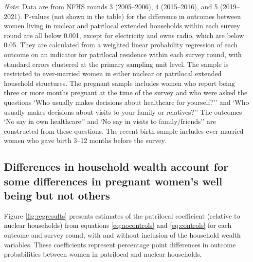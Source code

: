 \documentclass[10pt,twoside,reqno]{article}
\begin{document}
\begin{table}[H]
\caption{: Pregnant women in patrilocal extended households are advantaged in wealth and maternal healthcare use, but disadvantaged in autonomy outcomes}
\label{tab:sumstats}
\vspace{-4pt}

\begin{scriptsize}
\setlength{\tabcolsep}{7pt}
\renewcommand{\arraystretch}{1.15}

\makebox[\linewidth][c]{%
%
}

\end{scriptsize}

\vspace{1ex}
\small\scriptsize{\textsf{\textit{Note}: Data are from NFHS rounds 3 (2005--2006), 4 (2015--2016), and 5 (2019--2021).}}
\small\scriptsize{\textsf{P-values (not shown in the table) for the difference in outcomes between women living in nuclear and patrilocal extended households within each survey round are all below 0.001, except for electricity and owns radio, which are below 0.05. They are calculated from a weighted linear probability regression of each outcome on an indicator for patrilocal residence within each survey round, with standard errors clustered at the primary sampling unit level.}}
\newline
\small\scriptsize{\textsf{The sample is restricted to ever-married women in either nuclear or patrilocal extended household structures. The pregnant sample includes women who report being three or more months pregnant at the time of the survey and who were asked the questions `Who usually makes decisions about healthcare for yourself?'' and `Who usually makes decisions about visits to your family or relatives?''}}
\small\scriptsize{\textsf{The outcomes `No say in own healthcare'' and `No say in visits to family/friends'' are constructed from these questions. The recent birth sample includes ever-married women who gave birth 3--12 months before the survey.}}

\end{table}

\subsection*{Differences in household wealth account for some differences in pregnant women's well being but not others}

Figure \ref{fig:regresults} presents estimates of the patrilocal coefficient (relative to nuclear households) from equations \ref{eq:nocontrols} and \ref{eq:controls} for each outcome and survey round, with and without inclusion of the household wealth variables. These coefficients represent percentage point differences in outcome probabilities between women in patrilocal and nuclear households.
\end{document}
